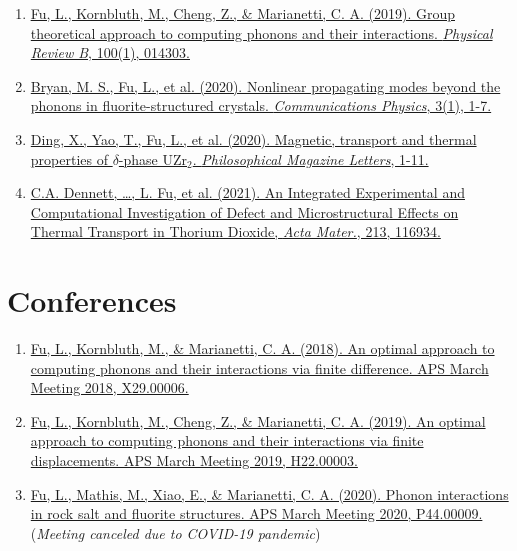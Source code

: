\documentclass[
  a4paper,
  12pt
]{cv}
\begin{document}
\begin{enumerate}
\item
\href{https://doi.org/10.1103/PhysRevB.100.014303}
{\underline{Fu, L.}, Kornbluth, M., Cheng, Z., \& Marianetti, C. A. (2019). 
Group theoretical approach to computing phonons and their interactions. 
\textit{Physical Review B}, 100(1), 014303.}
%
\item
\href{https://doi.org/10.1038/s42005-020-00483-2}{
Bryan, M. S., \underline{Fu, L.}, et al. (2020). 
Nonlinear propagating modes beyond the phonons in fluorite-structured crystals.
\textit{Communications Physics}, 3(1), 1-7.}
%
\item
\href{https://doi.org/10.1080/09500839.2020.1833375}{
Ding, X., Yao, T., \underline{Fu, L.}, et al. (2020).
Magnetic, transport and thermal properties of $\delta$-phase UZr$_{2}$.
\textit{Philosophical Magazine Letters}, 1-11.
}
%
\item
\href{https://doi.org/10.1016/j.actamat.2021.116934}{
C.A. Dennett, \dots, \underline{L. Fu}, et al. (2021).
An Integrated Experimental and Computational Investigation of Defect and Microstructural Effects on Thermal Transport in Thorium Dioxide, %
\textit{Acta Mater.}, 213, 116934.
}
%
\end{enumerate}


\section{Conferences}

\begin{enumerate}
\item
\href{https://meetings.aps.org/Meeting/MAR18/Event/322388}{
Fu, L., Kornbluth, M., \& Marianetti, C. A. (2018).
An optimal approach to computing phonons and their interactions via finite difference.
APS March Meeting 2018, X29.00006.
}
%
\item
\href{https://meetings.aps.org/Meeting/MAR19/Session/H22.3}{
Fu, L., Kornbluth, M., Cheng, Z., \& Marianetti, C. A. (2019).
An optimal approach to computing phonons and their interactions via finite displacements.
APS March Meeting 2019, H22.00003.
}
%
\item
\href{https://meetings.aps.org/Meeting/MAR20/Session/P44.9}{
Fu, L., Mathis, M., Xiao, E., \& Marianetti, C. A. (2020).
Phonon interactions in rock salt and fluorite structures.
APS March Meeting 2020, P44.00009.
} (\emph{Meeting canceled due to COVID-19 pandemic})
\end{enumerate}
\end{document}
